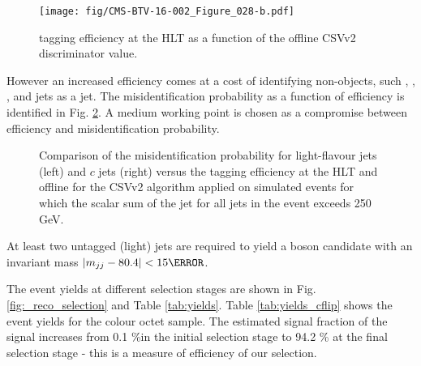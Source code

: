 \begin{figure}[hbtp]
\centering
\texttt{[image: fig/CMS-BTV-16-002\_Figure\_028-b.pdf]}
\caption{\cPqb tagging efficiency at the HLT as a function of the offline CSVv2 discriminator value. \cite{Sirunyan:2017ezt}}
\label{fig:CMS-BTV-16-002_Figure_028-b}
\end{figure}

However an increased efficiency comes at a cost of identifying non-\cPqb objects, such \cPqc, \cPqs, \cPqu, \cPqd and \Pg jets as a \cPqb jet. The misidentification probability as a function of efficiency is identified in Fig. \ref{fig:CMS-BTV-16-002_Figure_029}. A medium working point is chosen as a compromise between efficiency and misidentification probability.

\begin{figure}[hbtp]
\centering
  \def\twidth{0.45}
  \centering
\caption{Comparison of the misidentification probability for light-flavour jets (left) and $c$ jets (right) versus the \cPqb tagging efficiency at the HLT and offline for the CSVv2 algorithm applied on simulated \ttbar events for which the scalar sum of the jet \pt for all jets in the event exceeds 250 GeV. \cite{Sirunyan:2017ezt}}
\label{fig:CMS-BTV-16-002_Figure_029}
\end{figure}


At least two untagged (light) jets are required to yield a \PW boson candidate with an invariant mass $\left|m_{jj}-80.4\right|<15\GeV$.

The event yields at different selection stages are shown in Fig. \ref{fig:_reco_selection} and Table \ref{tab:yields}.  Table \ref{tab:yields_cflip} shows the event yields for the colour octet \PW sample. The estimated signal fraction of the signal increases from 0.1 \%in the initial selection stage to 94.2 \% at the final selection stage - this is a measure of efficiency of our selection.




